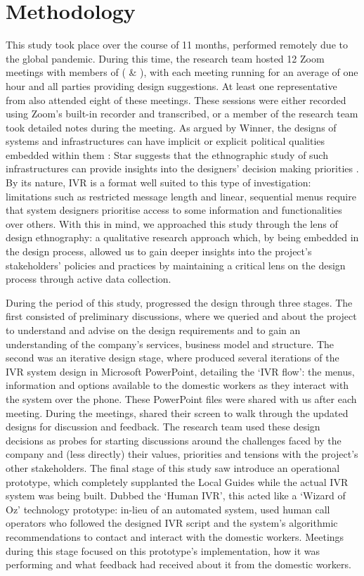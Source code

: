 \section{Methodology}

This study took place over the course of 11 months, performed remotely due to the global pandemic. During this time, the research team hosted 12 Zoom meetings with members of \PC{} (\PCOne{} \& \PCTwo{}), with each meeting running for an average of one hour and all parties providing design suggestions. At least one representative from \NGO{} also attended eight of these meetings. These sessions were either recorded using Zoom's built-in recorder and transcribed, or a member of the research team took detailed notes during the meeting. As argued by Winner, the designs of systems and infrastructures can have implicit or explicit political qualities embedded within them \cite{winner1980}: Star suggests that the ethnographic study of such infrastructures can provide insights into the designers' decision making priorities \cite{Star1999}. By its nature, IVR is a format well suited to this type of investigation: limitations such as restricted message length and linear, sequential menus require that system designers prioritise access to some information and functionalities over others. With this in mind, we approached this study through the lens of design ethnography: a qualitative research approach which, by being embedded in the design process, allowed us to gain deeper insights into the project's stakeholders' policies and practices by maintaining a critical lens on the design process through active data collection. 

During the period of this study, \PC{} progressed the design through three stages. The first consisted of preliminary discussions, where we queried \PC{} and \NGO{} about the project to understand and advise on the design requirements and to gain an understanding of the company's services, business model and structure. The second was an iterative design stage, where \PCTwo{} produced several iterations of the IVR system design in Microsoft PowerPoint, detailing the `IVR flow': the menus, information and options available to the domestic workers as they interact with the system over the phone. These PowerPoint files were shared with us after each meeting. During the meetings, \PCTwo{} shared their screen to walk through the updated designs for discussion and feedback. The research team used these design decisions as probes for starting discussions around the challenges faced by the company and (less directly) their values, priorities and tensions with the project's other stakeholders. The final stage of this study saw \PC{} introduce an operational prototype, which completely supplanted the Local Guides while the actual IVR system was being built. Dubbed the `Human IVR', this acted like a `Wizard of Oz' technology prototype: in-lieu of an automated system, \PC{} used human call operators who followed the designed IVR script and the system's algorithmic recommendations to contact and interact with the domestic workers. Meetings during this stage focused on this prototype's implementation, how it was performing and what feedback \PC{} had received about it from the domestic workers.

